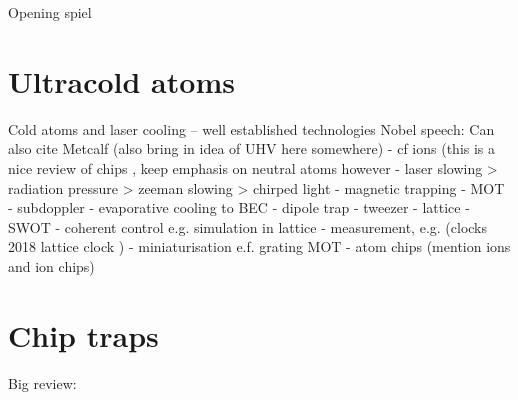 
Opening spiel
\cite{Andre2006}

\section{Ultracold atoms}


Cold atoms and laser cooling -- well established technologies
Nobel speech: \cite{RevModPhys.70.721}
Can also cite Metcalf \cite{Metcalf1999}
(also bring in idea of UHV here somewhere)
- cf ions \cite{RevModPhys.62.531} (this is a nice review of chips \cite{Romaszko2020}, keep emphasis on neutral atoms however
- laser slowing
  > radiation pressure \cite{PhysRevLett.40.1639}
  > zeeman slowing \cite{PhysRevLett.48.596}
  > chirped light \cite{Prodan1984}
- magnetic trapping \cite{PhysRevLett.54.2596}
- MOT \cite{PhysRevLett.59.2631}
- subdoppler \cite{Dalibard:89}
- evaporative cooling to BEC \cite{Anderson198}
- dipole trap \cite{Chu1986}
- tweezer \cite{Schlosser2001}
- lattice \cite{PhysRevLett.81.3108}
- SWOT \cite{Wu2017}
- coherent control e.g. simulation in lattice \cite{Schäfer2020}
- measurement, e.g. (clocks 2018 lattice clock \cite{PhysRevX.8.021036})
- miniaturisation e.f. grating MOT \cite{Nshii2013}
- atom chips (mention ions and ion chips)

\section{Chip traps}

Big review: \cite{2011Ac}

